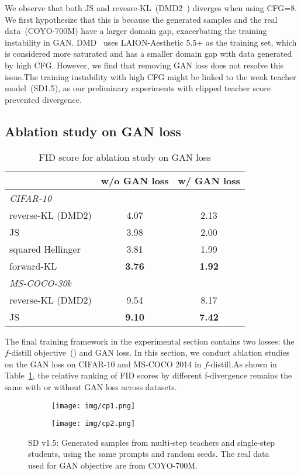 We observe that both JS and revesre-KL~(DMD2~\cite{yin2024improved}) diverges when using CFG=8. We first hypothesize that this is because the generated samples and the real data~(COYO-700M) have a larger domain gap, exacerbating the training instability in GAN. DMD~\cite{yin2024one, yin2024improved} uses LAION-Aesthetic 5.5+ as the training set, which is considered more saturated and has a smaller domain gap with data generated by high CFG. However, we find that removing GAN loss does not resolve this issue.The training instability with high CFG might be linked to the weak teacher model~(SD1.5), as our preliminary experiments with clipped teacher score prevented divergence.

\subsection{Ablation study on GAN loss}

\begin{table}[t]
\footnotesize
    \centering
    \begin{tabular}{l c c}
    \toprule
    &  w/o GAN loss & w/ GAN loss \\
    \midrule
   \textit{CIFAR-10}\\
    reverse-KL (DMD2)  & 4.07 & 2.13\\
    JS  & 3.98 & 2.00 \\
    squared Hellinger &3.81 & 1.99 \\
    forward-KL &\bf{3.76} & \bf{1.92}\\
    \midrule
    \textit{MS-COCO-30k}\\
    reverse-KL (DMD2)  & 9.54 & 8.17\\
    JS  & \bf{9.10} & \bf{7.42} \\
    \bottomrule
    \end{tabular}
    \caption{FID score for ablation study on GAN loss}
    \label{tab:gan-loss-ab}
\end{table}


The final training framework in the experimental section contains two losses: the $f$-distill objective~() and GAN loss. In this section, we conduct ablation studies on the GAN loss on CIFAR-10 and MS-COCO 2014 in $f$-distill.As shown in Table~\ref{tab:gan-loss-ab}, the relative ranking of FID scores by different f-divergence remains the same with or without GAN loss across datasets. 



\begin{figure*}
\centering
    \begin{subfigure}[b]{0.87\textwidth}
    \texttt{[image: img/cp1.png]}
  \end{subfigure}
  \vfill
  \begin{subfigure}[b]{0.87\textwidth}
    \texttt{[image: img/cp2.png]}
  \end{subfigure}
  \vspace{-12pt}
    \caption{SD v1.5: Generated samples from multi-step teachers and single-step students, using the same prompts and random seeds. The real data used for GAN objective are from COYO-700M.}
    \label{fig:vis-cfg-5}
\end{figure*}

